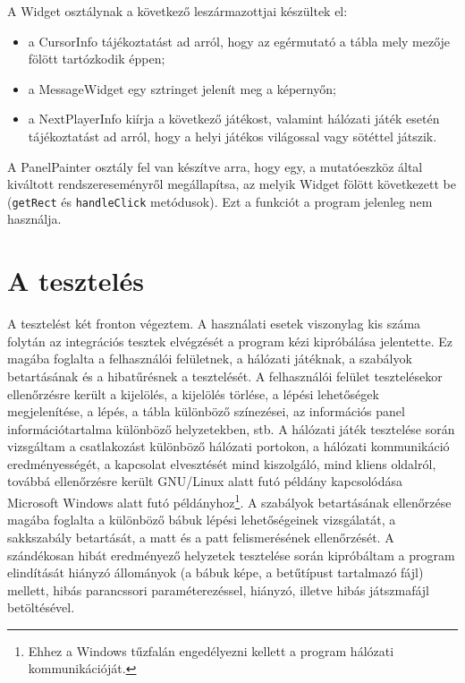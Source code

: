 \documentclass[12pt, twoside]{report}
\begin{document}
A Widget osztálynak a következő leszármazottjai készültek el:
\begin{itemize}
	\item a CursorInfo tájékoztatást ad arról, hogy az egérmutató a tábla mely mezője fölött tartózkodik éppen;
	\item a MessageWidget egy sztringet jelenít meg a képernyőn;
	\item a NextPlayerInfo kiírja a következő játékost, valamint hálózati játék esetén tájékoztatást ad arról, hogy a helyi játékos világossal vagy sötéttel játszik.
\end{itemize}

A PanelPainter osztály fel van készítve arra, hogy egy, a mutatóeszköz által kiváltott rendszereseményről megállapítsa, az melyik Widget fölött következett be ({\tt getRect} és {\tt handleClick} metódusok). Ezt a funkciót a program jelenleg nem használja.

\section{A tesztelés}

A tesztelést két fronton végeztem. A használati esetek viszonylag kis száma folytán az integrációs tesztek elvégzését a program kézi kipróbálása jelentette. Ez magába foglalta a felhasználói felületnek, a hálózati játéknak, a szabályok betartásának és a hibatűrésnek a tesztelését. A felhasználói felület tesztelésekor ellenőrzésre került a kijelölés, a kijelölés törlése, a lépési lehetőségek megjelenítése, a lépés, a tábla különböző színezései, az információs panel információtartalma különböző helyzetekben, stb. A hálózati játék tesztelése során vizsgáltam a csatlakozást különböző hálózati portokon, a hálózati kommunikáció eredményességét, a kapcsolat elvesztését mind kiszolgáló, mind kliens oldalról, továbbá ellenőrzésre került GNU/Linux alatt futó példány kapcsolódása Microsoft Windows alatt futó példányhoz\footnote{Ehhez a Windows tűzfalán engedélyezni kellett a program hálózati kommunikációját.}. A szabályok betartásának ellenőrzése magába foglalta a különböző bábuk lépési lehetőségeinek vizsgálatát, a sakkszabály betartását, a matt és a patt felismerésének ellenőrzését. A szándékosan hibát eredményező helyzetek tesztelése során kipróbáltam a program elindítását hiányzó állományok (a bábuk képe, a betűtípust tartalmazó fájl) mellett, hibás parancssori paraméterezéssel, hiányzó, illetve hibás játszmafájl betöltésével. 
\end{document}
